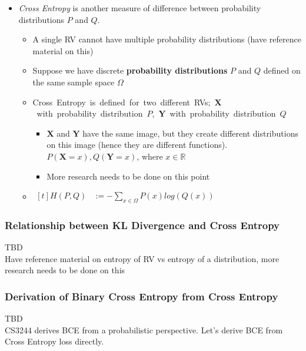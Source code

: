 \documentclass{article}
\begin{document}
\begin{itemize}
\begin{itemize}
        \end{itemize}
    \item \textit{Cross Entropy} is another measure of difference between probability distributions $P$ and $Q$.
        \begin{itemize}
            \item A single RV cannot have multiple probability distributions (have reference material on this)
            \item Suppose we have discrete \textbf{probability distributions} $P$ and $Q$ defined on the same sample space $\Omega$
            \item \mbox{Cross Entropy is defined for two different RVs; $\boldsymbol{X}$ with probability distribution $P$, $\boldsymbol{Y}$ with probability distribution $Q$}
                \begin{itemize}
                    \item $\boldsymbol{X}$ and $\boldsymbol{Y}$ have the same image, but they create different distributions on this image (hence they are different functions).
                            $P(\boldsymbol{X}=x), Q(\boldsymbol{Y}=x)$, where $x \in \mathds{R}$
                    \item More research needs to be done on this point
                \end{itemize}
            \item $\begin{aligned}[t]
                        H(P,Q) & := -\sum\limits_{x \in \Omega}P(x)log(Q(x))
                    \end{aligned}$
        \end{itemize}
\end{itemize}

\subsubsection{Relationship between KL Divergence and Cross Entropy}
TBD\\
Have reference material on entropy of RV vs entropy of a distribution, more research needs to be done on this

\subsubsection{Derivation of Binary Cross Entropy from Cross Entropy}
TBD\\
CS3244 derives BCE from a probabilistic perspective. Let's derive BCE from Cross Entropy loss directly.
\end{document}
